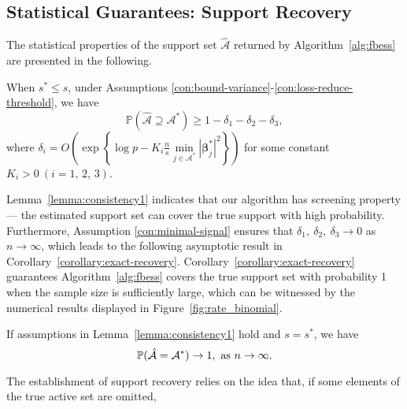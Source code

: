 \subsection{Statistical Guarantees: Support Recovery}\label{sec:statistical-guarantees}
The statistical properties of the support set $\hat{\mathcal{A}}$ returned by Algorithm~\ref{alg:fbess} are presented in the following.
\begin{lemma}\label{lemma:consistency1}
When $s^* \leq s$,
under Assumptions \ref{con:bound-variance}-\ref{con:loss-reduce-threshold}, we have
\begin{equation*}
\mathbb{P}(\hat{\mathcal{A}} \supseteq \mathcal{A}^*) \geq 1 - \delta_1 - \delta_2 - \delta_3,
\end{equation*}
where
$\delta_i = O\left(\exp\left\{\log p - K_i\frac{n}{s} \min\limits_{j\in\mathcal{A}^*} |\boldsymbol{\beta}_j^*|^2 \right\}\right)$
for some constant $K_i>0\ (i = 1,\,2,\,3)$.
\end{lemma}
Lemma~\ref{lemma:consistency1} indicates that our algorithm has screening property --- the estimated support set can cover the true support with high probability.
Furthermore,
Assumption \ref{con:minimal-signal} ensures that $\delta_1,\ \delta_2,\ \delta_3 \rightarrow 0$ as $n \rightarrow \infty$, which leads to the following asymptotic result in Corollary~\ref{corollary:exact-recovery}.
Corollary~\ref{corollary:exact-recovery} guarantees Algorithm~\ref{alg:fbess} covers the true support set with probability 1
when the sample size is sufficiently large,
which can be witnessed by the numerical results displayed in Figure~\ref{fig:rate_binomial}.
\begin{corollary}\label{corollary:exact-recovery}
If assumptions in Lemma~\ref{lemma:consistency1} hold and $s = s^*$, we have
\begin{equation*}
\mathbb{P}(\hat{\mathcal{A}} = \mathcal{A}^*) \to 1, \textup{ as } n \to \infty.
\end{equation*}
\end{corollary}
The establishment of support recovery relies on the idea that,
if some elements of the true active set are omitted,
